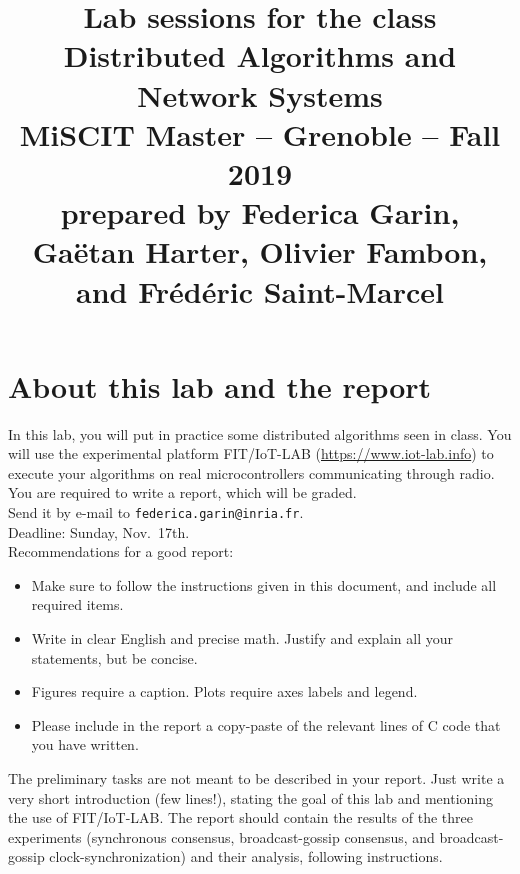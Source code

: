 \documentclass[oneside]{article}
\begin{document}
\title{
{\normalsize Lab sessions for the class}\\[-1mm]
Distributed Algorithms and Network Systems\\[-1mm]
{\normalsize MiSCIT Master -- Grenoble -- Fall 2019}\\[-1mm]
{\normalsize prepared by Federica Garin, Ga\"{e}tan Harter,  Olivier Fambon, and Fr\'ed\'eric Saint-Marcel}}
\date{}
\maketitle



\section{About this lab and the report}
In this lab, you will put in practice some distributed algorithms seen in class.
You will use the experimental platform FIT/IoT-LAB (\url{https://www.iot-lab.info})
to execute your algorithms on real microcontrollers communicating through radio.\\

You are required to write a report, which will be graded.\\ Send it by e-mail to \texttt{federica.garin@inria.fr}.\\
Deadline: Sunday, Nov.~17th.\\

Recommendations for a good report:
\begin{itemize}
\item Make sure to follow the instructions given in this document, and include all required items.
\item Write in clear English and precise math. Justify and explain all your statements, but be concise.
\item Figures require a caption. Plots require axes labels and legend.
\item Please include in the report a copy-paste of the relevant lines of C code that you have written.
\end{itemize}

The preliminary tasks are not meant to be described in your report. Just write a very short introduction (few lines!), stating the goal of this lab and mentioning the use of FIT/IoT-LAB.
The report should contain the results of the three experiments (synchronous consensus, broadcast-gossip consensus, and broadcast-gossip clock-synchronization) and their analysis, following instructions.
\end{document}
